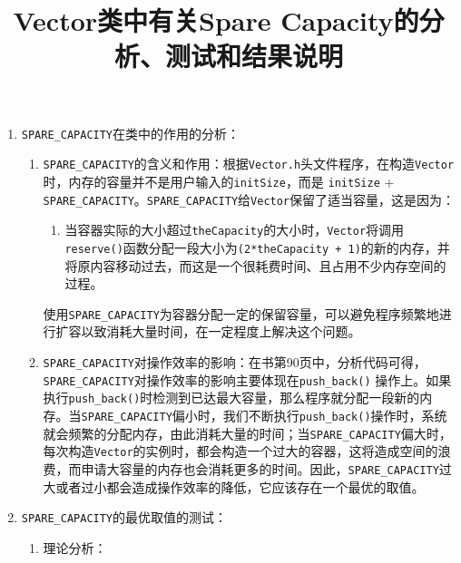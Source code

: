 \documentclass[a4paper,12pt]{article}
\begin{document}
\title{\hei Vector类中有关Spare Capacity的分析、测试和结果说明}


\maketitle


\begin{enumerate}
\item \verb|SPARE_CAPACITY|在类中的作用的分析：
\begin{enumerate}
    \item \verb|SPARE_CAPACITY|的含义和作用：根据\verb|Vector.h|头文件程序，在构造\verb|Vector|时，内存的容量并不是用户输入的\verb|initSize|，而是
    \verb|initSize| +\verb| SPARE_CAPACITY|。\verb|SPARE_CAPACITY|给\verb|Vector|保留了适当容量，这是因为：
    \begin{enumerate}
        \item 当容器实际的大小超过\verb|theCapacity|的大小时，\verb|Vector|将调用\verb|reserve()|函数分配一段大小为\verb|(2*theCapacity + 1)|的新的内存，并将原内容移动过去，而这是一个很耗费时间、且占用不少内存空间的过程。
    \end{enumerate}
    使用\verb|SPARE_CAPACITY|为容器分配一定的保留容量，可以避免程序频繁地进行扩容以致消耗大量时间，在一定程度上解决这个问题。
    \item \verb|SPARE_CAPACITY|对操作效率的影响：在书第90页中，分析代码可得，\verb|SPARE_CAPACITY|对操作效率的影响主要体现在\verb|push_back()|
    操作上。如果执行\verb|push_back()|时检测到已达最大容量，那么程序就分配一段新的内存。当\verb|SPARE_CAPACITY|偏小时，我们不断执行\verb|push_back()|操作时，系统就会频繁的分配内存，由此消耗大量的时间；当\verb|SPARE_CAPACITY|偏大时，每次构造\verb|Vector|的实例时，都会构造一个过大的容器，这将造成空间的浪费，而申请大容量的内存也会消耗更多的时间。因此，\verb|SPARE_CAPACITY|过大或者过小都会造成操作效率的降低，它应该存在一个最优的取值。
\end{enumerate}
\item \verb|SPARE_CAPACITY|的最优取值的测试：
\begin{enumerate}
    \item 理论分析：
    \begin{enumerate}

\end{enumerate}
\end{enumerate}
\end{enumerate}
\end{document}
